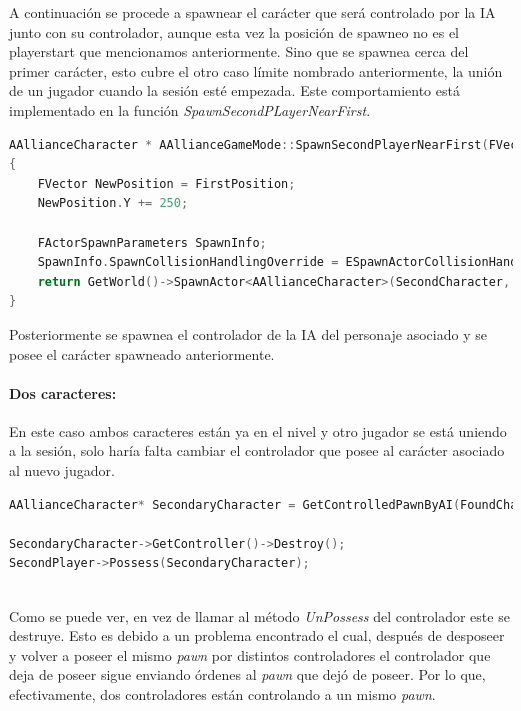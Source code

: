 A continuación se procede a spawnear el carácter que será controlado por la IA junto con su controlador, aunque esta vez la posición de spawneo no es el playerstart que mencionamos anteriormente. Sino que se spawnea cerca del primer carácter, esto cubre el otro caso límite nombrado anteriormente, la unión de un jugador cuando la sesión esté empezada. Este comportamiento está implementado en la función \textit{SpawnSecondPLayerNearFirst}.

\begin{lstlisting}[language=c++,caption={Método \textit{SpawnSecondPlayerNearFirst}},captionpos=b,label={lstSpawnSecondPLayerNearFirst}]
AAllianceCharacter * AAllianceGameMode::SpawnSecondPlayerNearFirst(FVector FirstPosition, FRotator FirstRotation, TSubclassOf<class AAllianceCharacter> SecondCharacter)
{
	FVector NewPosition = FirstPosition;
	NewPosition.Y += 250;

	FActorSpawnParameters SpawnInfo;
	SpawnInfo.SpawnCollisionHandlingOverride = ESpawnActorCollisionHandlingMethod::AlwaysSpawn;
	return GetWorld()->SpawnActor<AAllianceCharacter>(SecondCharacter, NewPosition, FirstRotation, SpawnInfo);
}
\end{lstlisting}

Posteriormente se spawnea el controlador de la IA del personaje asociado y se posee el carácter spawneado anteriormente.


\paragraph{Dos caracteres:}

En este caso ambos caracteres están ya en el nivel y otro jugador se está uniendo a la sesión, solo haría falta cambiar el controlador que posee al carácter asociado al nuevo jugador.


\begin{lstlisting}[language=c++,caption={Cambio de controlador del carácter IA},captionpos=b,label={lstRespawnControllerChange}]
AAllianceCharacter* SecondaryCharacter = GetControlledPawnByAI(FoundCharacters);

SecondaryCharacter->GetController()->Destroy();
SecondPlayer->Possess(SecondaryCharacter);
\end{lstlisting} \\

Como se puede ver, en vez de llamar al método \textit{UnPossess} del controlador este se destruye. Esto es debido a un problema encontrado el cual, después de desposeer y volver a poseer el mismo \textit{pawn} por distintos controladores el controlador que deja de poseer sigue enviando órdenes al \textit{pawn} que dejó de poseer. Por lo que, efectivamente, dos controladores están controlando a un mismo \textit{pawn}.

